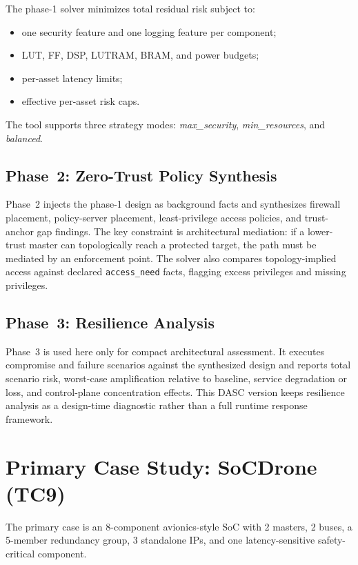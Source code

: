 \documentclass[conference]{IEEEtran}
\begin{document}
The phase-1 solver minimizes total residual risk subject to:
\begin{itemize}
\item one security feature and one logging feature per component;
\item LUT, FF, DSP, LUTRAM, BRAM, and power budgets;
\item per-asset latency limits;
\item effective per-asset risk caps.
\end{itemize}

The tool supports three strategy modes: \textit{max\_security},
\textit{min\_resources}, and \textit{balanced}.

\subsection{Phase~2: Zero-Trust Policy Synthesis}

Phase~2 injects the phase-1 design as background facts and synthesizes
firewall placement, policy-server placement, least-privilege access policies,
and trust-anchor gap findings. The key constraint is architectural
mediation: if a lower-trust master can topologically reach a protected
target, the path must be mediated by an enforcement point. The solver also
compares topology-implied access against declared \texttt{access\_need}
facts, flagging excess privileges and missing privileges.

\subsection{Phase~3: Resilience Analysis}

Phase~3 is used here only for compact architectural assessment. It executes
compromise and failure scenarios against the synthesized design and reports
total scenario risk, worst-case amplification relative to baseline, service
degradation or loss, and control-plane concentration effects. This DASC
version keeps resilience analysis as a design-time diagnostic rather than a
full runtime response framework.

\section{Primary Case Study: SoCDrone (TC9)}

The primary case is an 8-component avionics-style SoC with 2 masters, 2
buses, a 5-member redundancy group, 3 standalone IPs, and one
latency-sensitive safety-critical component.
\end{document}
